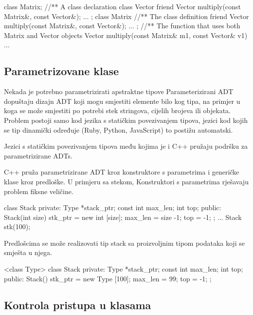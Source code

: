 \documentclass[11pt]{book}
\begin{document}
\begin{shortlisting}
  class Matrix; //** A class declaration
  class Vector {
      friend Vector multiply(const Matrix&, const Vector&);
      ...
    }; class Matrix { //** The class definition
      friend Vector multiply(const Matrix&, const Vector&);
      ...
    };
  //** The function that uses both Matrix and Vector objects
  Vector multiply(const Matrix& m1, const Vector& v1) {
      ...
    }
\end{shortlisting}

\subsection{Parametrizovane klase}

Nekada je potrebno parametrizirati apstraktne tipove Parameterizirani ADT dopuštaju dizajn ADT koji mogu smjestiti elemente bilo kog tipa, na primjer u koga se može smjestiti po potrebi stek  stringova, cijelih brojeva ili objekata. Problem postoji samo kod jezika s statičkim povezivanjem tipova, jezici kod kojih se tip dinamički određuje (Ruby, Python, JavaScript) to postižu automatski.

Jezici  s  statičkim  povezivanjem  tipova  među  kojima  je  i  C++  pružaju  podršku  za parametrizirane ADTs.

C++ pruža parametrizirane ADT kroz konstruktore s parametrima i generičke klase kroz predloške. U primjeru sa stekom, Konstruktori s parametrima rješavaju problem fiksne veličine.

\begin{shortlisting}
  class Stack {
      private: Type *stack_ptr;
      const int max_len;
      int top;
      public:
      Stack(int size) {
          stk_ptr = new int [size];
          max_len = size -1;
          top = -1;
        } ;
      ...
    }
  Stack stk(100);
\end{shortlisting}

Predlošcima se može realizovati tip stack sa proizvoljnim tipom podataka koji se smješta u njega.

\begin{shortlisting}
  <class Type> class Stack {
      private: Type *stack_ptr;
      const int max_len;
      int top;
      public:
      Stack() {
          stk_ptr = new Type [100];
          max_len = 99;
          top = -1;
        }
    } ;
\end{shortlisting}


\subsection{Kontrola pristupa u klasama}
\end{document}
